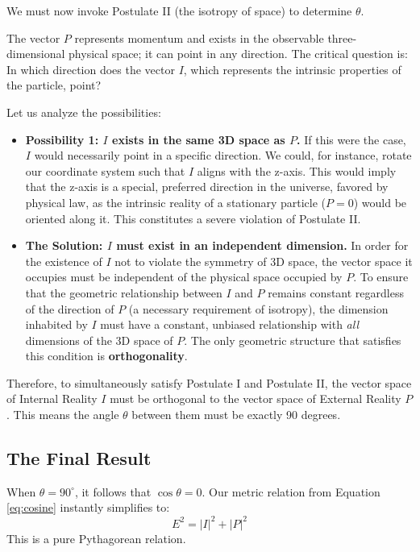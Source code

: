 \documentclass[12pt, a4paper]{article}
\begin{document}
We must now invoke Postulate II (the isotropy of space) to determine $\theta$.

The vector $P$ represents momentum and exists in the observable three-dimensional physical space; it can point in any direction. The critical question is: In which direction does the vector $I$, which represents the intrinsic properties of the particle, point?

Let us analyze the possibilities:
\begin{itemize}
    \item \textbf{Possibility 1: $I$ exists in the same 3D space as $P$.} If this were the case, $I$ would necessarily point in a specific direction. We could, for instance, rotate our coordinate system such that $I$ aligns with the z-axis. This would imply that the z-axis is a special, preferred direction in the universe, favored by physical law, as the intrinsic reality of a stationary particle ($P=0$) would be oriented along it. This constitutes a severe violation of Postulate II.

    \item \textbf{The Solution: $I$ must exist in an independent dimension.} In order for the existence of $I$ not to violate the symmetry of 3D space, the vector space it occupies must be independent of the physical space occupied by $P$. To ensure that the geometric relationship between $I$ and $P$ remains constant regardless of the direction of $P$ (a necessary requirement of isotropy), the dimension inhabited by $I$ must have a constant, unbiased relationship with \textit{all} dimensions of the 3D space of $P$. The only geometric structure that satisfies this condition is \textbf{orthogonality}.
\end{itemize}
Therefore, to simultaneously satisfy Postulate I and Postulate II, the vector space of Internal Reality $I$ must be orthogonal to the vector space of External Reality $P$. This means the angle $\theta$ between them must be exactly 90 degrees.

\subsection{The Final Result}

When $\theta = 90^\circ$, it follows that $\cos\theta = 0$. Our metric relation from Equation \eqref{eq:cosine} instantly simplifies to:
\begin{equation}
    E^2 = |I|^2 + |P|^2
    \label{eq:pythag}
\end{equation}
This is a pure Pythagorean relation.
\end{document}
